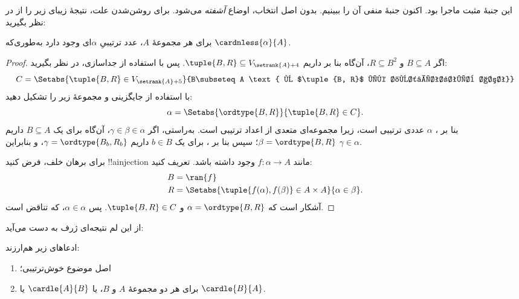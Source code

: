 \documentclass[../../../include/open-logic-section]{subfiles}
\begin{document}

این جنبهٔ مثبت ماجرا بود. اکنون جنبهٔ منفی آن را ببینیم. بدون اصل
انتخاب، اوضاع \emph{آشفته} می‌شود. برای روشن‌شدن علت، نتیجهٔ زیبای
زیر را از \cite{Hartogs1915} در نظر بگیرید:

\begin{lem}[\emph{در $\ZF$}]
برای هر مجموعهٔ $A$، عدد ترتیبیِ $\alpha$ای وجود دارد به‌طوری‌که
$\cardnless{\alpha}{A}$.
\end{lem}

\begin{proof}
اگر $B \subseteq A$ و $R \subseteq B^2$، آن‌گاه بنا بر
 داریم
$\tuple{B, R} \subseteq V_{\setrank{A}+4}$. پس با استفاده از
جداسازی، در نظر بگیرید:
\[
	C = \Setabs{\tuple{B, R} \in V_{\setrank{A}+5}}{B\subseteq A
	\text{ و $\tuple{B, R}$ یک خوش‌ترتیب است}}
\]
با استفاده از جایگزینی و
 مجموعهٔ زیر را
تشکیل دهید:
\[
	\alpha = \Setabs{\ordtype{B, R}}{\tuple{B, R} \in C}.
\]
بنا بر ، $\alpha$ عددی
ترتیبی است، زیرا مجموعه‌ای متعدی از اعداد ترتیبی است. به‌راستی، اگر
$\gamma \in \beta \in \alpha$، آن‌گاه برای یک
$B \subseteq A$ داریم $\beta = \ordtype{B, R}$؛ سپس بنا بر
، برای یک $b \in B$
داریم $\gamma = \ordtype{B_b, R_b}$، و بنابراین
$\gamma \in \alpha$.

برای برهان خلف، فرض کنید !!a{injection} مانند
$f \colon \alpha \to A$ وجود داشته باشد. تعریف کنید:
\begin{align*}
	B &= \ran{f}\\
	R &= \Setabs{\tuple{f(\alpha), f(\beta)} \in A \times A}{\alpha \in \beta}.
\end{align*}
آشکار است که $\alpha = \ordtype{B, R}$ و
$\tuple{B, R} \in C$. پس $\alpha \in \alpha$، که تناقض است.
\end{proof}

از این لم نتیجه‌ای ژرف به دست می‌آید:

\begin{thm}[\emph{در $\ZF$}]
ادعاهای زیر هم‌ارزند:
\begin{enumerate}
	\item{} اصل موضوع خوش‌ترتیبی؛
	\item{} برای هر دو مجموعهٔ $A$ و $B$، یا
	$\cardle{A}{B}$ یا $\cardle{B}{A}$.
\end{enumerate}
\end{thm}
\end{document}
